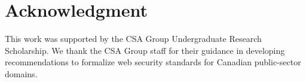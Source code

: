 \documentclass[conference]{IEEEtran}
\begin{document}

\section*{Acknowledgment}

This work was supported by the CSA Group Undergraduate Research Scholarship. We thank the CSA Group staff for their guidance in developing recommendations to formalize web security standards for Canadian public-sector domains.






\end{document}

